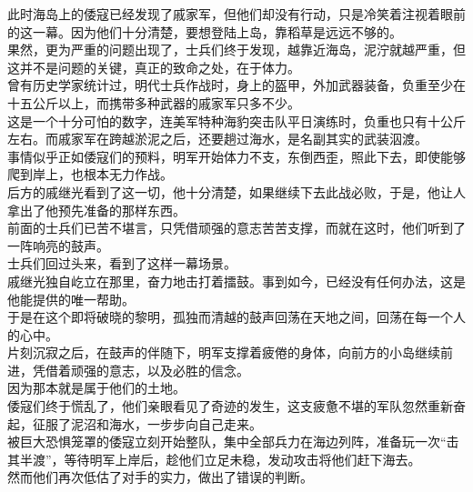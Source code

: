 \begin{multicols}{\theparacolNo}
此时海岛上的倭寇已经发现了戚家军，但他们却没有行动，只是冷笑着注视着眼前的这一幕。因为他们十分清楚，要想登陆上岛，靠稻草是远远不够的。\\

果然，更为严重的问题出现了，士兵们终于发现，越靠近海岛，泥泞就越严重，但这并不是问题的关键，真正的致命之处，在于体力。\\

曾有历史学家统计过，明代士兵作战时，身上的盔甲，外加武器装备，负重至少在十五公斤以上，而携带多种武器的戚家军只多不少。\\

这是一个十分可怕的数字，连美军特种海豹突击队平日演练时，负重也只有十公斤左右。而戚家军在跨越淤泥之后，还要趟过海水，是名副其实的武装泅渡。\\

事情似乎正如倭寇们的预料，明军开始体力不支，东倒西歪，照此下去，即使能够爬到岸上，也根本无力作战。\\

后方的戚继光看到了这一切，他十分清楚，如果继续下去此战必败，于是，他让人拿出了他预先准备的那样东西。\\

前面的士兵们已苦不堪言，只凭借顽强的意志苦苦支撑，而就在这时，他们听到了一阵响亮的鼓声。\\

士兵们回过头来，看到了这样一幕场景。\\

戚继光独自屹立在那里，奋力地击打着擂鼓。事到如今，已经没有任何办法，这是他能提供的唯一帮助。\\

于是在这个即将破晓的黎明，孤独而清越的鼓声回荡在天地之间，回荡在每一个人的心中。\\

片刻沉寂之后，在鼓声的伴随下，明军支撑着疲倦的身体，向前方的小岛继续前进，凭借着顽强的意志，以及必胜的信念。\\

因为那本就是属于他们的土地。\\

倭寇们终于慌乱了，他们亲眼看见了奇迹的发生，这支疲惫不堪的军队忽然重新奋起，征服了泥沼和海水，一步步向自己走来。\\

被巨大恐惧笼罩的倭寇立刻开始整队，集中全部兵力在海边列阵，准备玩一次“击其半渡”，等待明军上岸后，趁他们立足未稳，发动攻击将他们赶下海去。\\

然而他们再次低估了对手的实力，做出了错误的判断。\\


\end{multicols}
